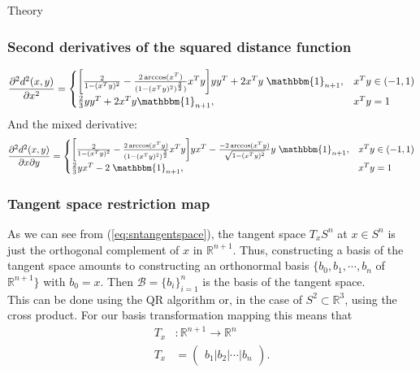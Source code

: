 \begin{chapter}{Theory}
\subsubsection{Second derivatives of the squared distance function} %
\label{ssub:SecondDerS2}
\begin{equation}
    \frac{\partial^2 d^2(x,y)}{\partial x^2}=\begin{cases}
	\bigg[\frac{2}{1-(x^Ty)^2}-\frac{2\arccos(x^T)}{(1-(x^Ty)^{2})^{\frac{3}{2}})}x^Ty\bigg]yy^T+2x^Ty\;\mathbbm{1}_{n+1}, & x^Ty\in(-1,1)\\
	\frac{2}{3}yy^T+2x^Ty\mathbbm{1}_{n+1}, & x^Ty=1
    \end{cases}
\end{equation}
And the mixed derivative:
\begin{equation}
    \frac{\partial^2 d^2(x,y)}{\partial x\partial y}=\begin{cases}
	\bigg[\frac{2}{1-(x^Ty)^2}-\frac{2\arccos(x^Ty)}{(1-(x^Ty)^{2})^{\frac{3}{2}}}x^Ty\bigg]yx^T-\frac{-2\arccos(x^Ty)}{\sqrt{1-(x^Ty)^{2}}}y\;\mathbbm{1}_{n+1} , & x^Ty\in(-1,1)\\
	\frac{2}{3}yx^T -2\;\mathbbm{1}_{n+1}, & x^Ty=1
    \end{cases}
\end{equation}


\subsubsection{Tangent space restriction map} %
\label{ssub:TangentS2}
As we can see from (\ref{eq:sntangentspace}), the tangent space $T_xS^n$ at $x\in S^n$ is just the orthogonal complement of $x$ in $\mathbb{R}^{n+1}$.
Thus, constructing a basis of the tangent space amounts to constructing an orthonormal basis $\lbrace b_0,b_1,\cdots,b_n$ of $\mathbb{R}^{n+1}\rbrace$ with $b_0=x$. Then
$\mathcal{B}=\lbrace b_i\rbrace_{i=1}^{n}$ is the basis of the tangent space.\\
This can be done using the QR algorithm or, in the case of $S^2\subset\mathbb{R}^3$, using the cross product. For our basis transformation mapping this means that
\begin{align}
    T_x &: \mathbb{R}^{n+1}\to \mathbb{R}^{n}\\
    T_x &= \begin{pmatrix}
    b_1 | b_2 | \cdots | b_n
    \end{pmatrix}.
\end{align}


\end{chapter}
